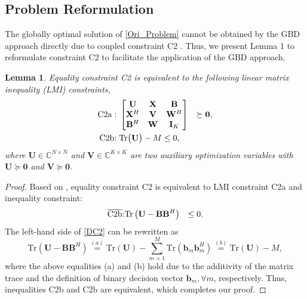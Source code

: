 \documentclass[12pt, draftclsnofoot, onecolumn]{IEEEtran}
\newtheorem{lemma}{Lemma}
\begin{document}
\subsection{Problem Reformulation}
The globally optimal solution of \eqref{Ori_Problem} cannot be obtained by the GBD approach directly due to coupled constraint C2 \cite{geoffrion1972generalized} \cite{wu2023globally}. Thus, we present Lemma 1 to reformulate constraint C2 to facilitate the application of the GBD approach.
\begin{lemma}
Equality constraint C2 is equivalent to the following linear matrix inequality (LMI) constraints, 
\begin{eqnarray}
\mathrm{{C2a:}}&\hspace*{1mm}\label{sdp}
   \begin{bmatrix}
        \mathbf{U} & \mathbf{X} & \mathbf{B}\\
        \mathbf{X}^H & \mathbf{V} & \mathbf{W}^H\\
        \mathbf{B}^H & \mathbf{W} & \mathbf{I}_K
    \end{bmatrix}&\succeq \mathbf{0},\\
{\mathrm{C2b}}\mbox{:}&\hspace*{1mm}\label{DC}\mathrm{Tr}\big(\mathbf{U}\big)-M\leq 0,\vspace*{-2mm}
\end{eqnarray}
where $\mathbf{U}\in\mathbb{C}^{N\times N}$ and $\mathbf{V}\in\mathbb{C}^{K\times K}$ are two auxiliary optimization variables with $\mathbf{U}\succeq \mathbf{0}$ and $\mathbf{V}\succeq \mathbf{0}$.
\end{lemma}
\begin{proof}
Based on \cite[Lemma 1]{6698281}, equality constraint C2 is equivalent to LMI constraint C2a and inequality constraint:
\begin{eqnarray}\label{DC2}
\overline{\mbox{C2b}}\mbox{:}&%
    \mathrm{Tr}\left(\mathbf{U}-\mathbf{B}\mathbf{B}^H\right)&\leq0.\vspace*{-2mm}
\end{eqnarray}
The left-hand side of \eqref{DC2} can be rewritten as
\begin{equation}
         \mathrm{Tr}\left(\mathbf{U}-\mathbf{B}\mathbf{B}^H\right)\overset{(a)}{=}\mathrm{Tr}\left(\mathbf{U}\right)-\sum_{m=1}^{M}\mathrm{Tr}\left(\mathbf{b}_m\mathbf{b}_m^H\right)\overset{(b)}{=}
         \mathrm{Tr}\left(\mathbf{U}\right)-M,
\end{equation}
where the above equalities (a) and (b) hold due to the additivity of the matrix trace and the definition of binary decision vector $\mathbf{b}_m,\forall m$, respectively. Thus, inequalities C2b and $\overline{\mbox{C2b}}$ are equivalent, which completes our proof.
\end{proof}
\end{document}
